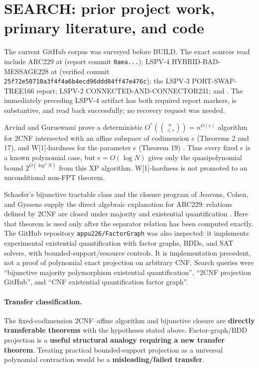 \documentclass[11pt]{article}
\begin{document}
\section{SEARCH: prior project work, primary literature, and code}
The current GitHub corpus was surveyed before BUILD.  The exact sources read
include ARC229 at
(report commit \texttt{0aea...}); LSPV-4 HYBRID-BAD-MESSAGE228 at
(verified commit \texttt{25f72e50710a3f4f4a6b4ecd96ddd84ff47e476c}); the LSPV-3
PORT-SWAP-TREE166 report; LSPV-2 CONNECTED-AND-CONNECTOR231; and
.
The immediately preceding LSPV-4 artifact has both required report markers,
is substantive, and read back successfully; no recovery request was needed.

Arvind and Guruswami prove a deterministic
$O^*(\binom{n}{\le e})=n^{O(e)}$ algorithm for 2CNF intersected with an
affine subspace of codimension $e$ (Theorems 2 and 17), and W[1]-hardness for
the parameter $e$ (Theorem 19) \cite{AG}.  Thus every fixed $e$ is a known
polynomial case, but $e=O(\log N)$ gives only the quasipolynomial bound
$2^{O(\log^2N)}$ from this XP algorithm.  W[1]-hardness is not promoted to an
unconditional non-FPT theorem.

Schaefer's bijunctive tractable class and the closure program of Jeavons,
Cohen, and Gyssens supply the direct algebraic explanation for ARC229:
relations defined by 2CNF are closed under majority and existential
quantification \cite{Schaefer,JCG}.  Here that theorem is used only after the
separator relation has been computed exactly.  The GitHub repository
\texttt{appu226/FactorGraph} was also inspected: it implements experimental
existential quantification with factor graphs, BDDs, and SAT solvers, with
bounded-support/resource controls.  It is implementation precedent, not a
proof of polynomial exact projection on arbitrary CNF.  Search queries were
``bijunctive majority polymorphism existential quantification'', ``2CNF
projection GitHub'', and ``CNF existential quantification factor graph''.

\paragraph{Transfer classification.}
The fixed-codimension 2CNF--affine algorithm and bijunctive closure are
\textbf{directly transferable theorems} with the hypotheses stated above.
Factor-graph/BDD projection is a \textbf{useful structural analogy requiring
a new transfer theorem}.  Treating practical bounded-support projection as a
universal polynomial contraction would be a \textbf{misleading/failed
transfer}.
\end{document}

